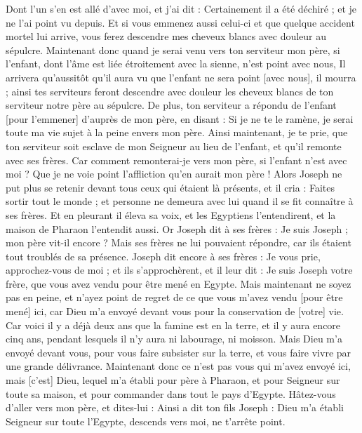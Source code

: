 \begin{multicols}{2}
Dont l'un s'en est allé d'avec moi, et j'ai dit : Certainement il a été déchiré ; et je ne l'ai point vu depuis.
Et si vous emmenez aussi celui-ci et que quelque accident mortel lui arrive, vous ferez descendre mes cheveux blancs avec douleur au sépulcre.
Maintenant donc quand je serai venu vers ton serviteur mon père, si l'enfant, dont l'âme est liée étroitement avec la sienne, n'est point avec nous,
Il arrivera qu'aussitôt qu'il aura vu que l'enfant ne sera point [avec nous], il mourra ; ainsi tes serviteurs feront descendre avec douleur les cheveux blancs de ton serviteur notre père au sépulcre.
De plus, ton serviteur a répondu de l'enfant [pour l'emmener] d'auprès de mon père, en disant : Si je ne te le ramène, je serai toute ma vie sujet à la peine envers mon père.
Ainsi maintenant, je te prie, que ton serviteur soit esclave de mon Seigneur au lieu de l'enfant, et qu'il remonte avec ses frères.
Car comment remonterai-je vers mon père, si l'enfant n'est avec moi ? Que je ne voie point l'affliction qu'en aurait mon père !
\VerseOne{}Alors Joseph ne put plus se retenir devant tous ceux qui étaient là présents, et il cria : Faites sortir tout le monde ; et personne ne demeura avec lui quand il se fit connaître à ses frères.
Et en pleurant il éleva sa voix, et les Egyptiens l'entendirent, et la maison de Pharaon l'entendit aussi.
Or Joseph dit à ses frères : Je suis Joseph ; mon père vit-il encore ? Mais ses frères ne lui pouvaient répondre, car ils étaient tout troublés de sa présence.
Joseph dit encore à ses frères : Je vous prie, approchez-vous de moi ; et ils s'approchèrent, et il leur dit : Je suis Joseph votre frère, que vous avez vendu pour être mené en Egypte.
Mais maintenant ne soyez pas en peine, et n'ayez point de regret de ce que vous m'avez vendu [pour être mené] ici, car Dieu m'a envoyé devant vous pour la conservation de [votre] vie.
Car voici il y a déjà deux ans que la famine est en la terre, et il y aura encore cinq ans, pendant lesquels il n'y aura ni labourage, ni moisson.
Mais Dieu m'a envoyé devant vous, pour vous faire subsister sur la terre, et vous faire vivre par une grande délivrance.
Maintenant donc ce n'est pas vous qui m'avez envoyé ici, mais [c'est] Dieu, lequel m'a établi pour père à Pharaon, et pour Seigneur sur toute sa maison, et pour commander dans tout le pays d'Egypte.
Hâtez-vous d'aller vers mon père, et dites-lui : Ainsi a dit ton fils Joseph : Dieu m'a établi Seigneur sur toute l'Egypte, descends vers moi, ne t'arrête point.

\end{multicols}
